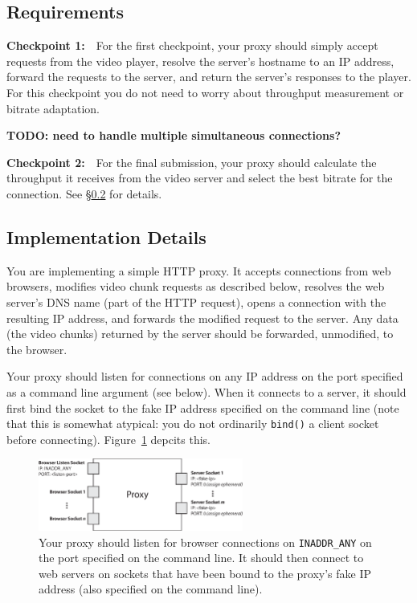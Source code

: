 \documentclass{article}
\begin{document}
\subsection{Requirements}

\bigskip \noindent \textbf{Checkpoint 1:}~~For the first checkpoint, your proxy
should simply accept requests from the video player, resolve the server's
hostname to an IP address, forward the requests to the server, and return the
server's responses to the player. For this checkpoint you do not need to worry
about throughput measurement or bitrate adaptation.

\textbf{TODO: need to handle multiple simultaneous connections?}


\bigskip \noindent \textbf{Checkpoint 2:}~~For the final submission, your proxy
should calculate the throughput it receives from the video server and select
the best bitrate for the connection. See \S\ref{sec:proxy-details} for details.


\subsection{Implementation Details}
\label{sec:proxy-details}

You are implementing a simple HTTP proxy. It accepts connections from web
browsers, modifies video chunk requests as described below, resolves the web
server's DNS name (part of the HTTP request), opens a connection with the
resulting IP address, and forwards the modified request to the server. Any data
(the video chunks) returned by the server should be forwarded, unmodified, to
the browser.

Your proxy should listen for connections on any IP address on the port
specified as a command line argument (see below). When it connects to a server,
it should first bind the socket to the fake IP address specified on the command
line (note that this is somewhat atypical: you do not ordinarily
\texttt{bind()} a client socket before connecting). Figure~\ref{fig:proxy}
depcits this.

\begin{figure}
	\centering
	\includegraphics[width=0.6\textwidth]{figs/proxy.eps}
	\caption{Your proxy should listen for browser connections on
	\texttt{INADDR\_ANY} on the port specified on the command line. It should
	then connect to web servers on sockets that have been bound to the proxy's
	fake IP address (also specified on the command line).}

	\label{fig:proxy}
\end{figure}
\end{document}
